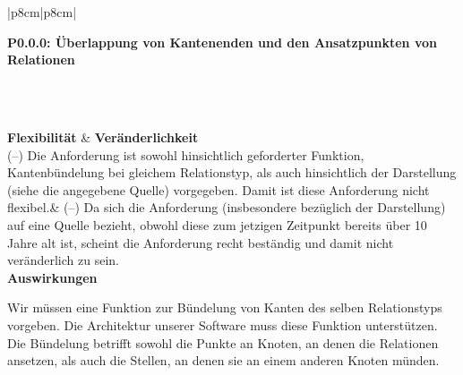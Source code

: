 \documentclass[enabledeprecatedfontcommands,fontsize=11pt,paper=a4,twoside]{scrartcl}
\newcounter{one}
\newcounter{two}[one]
\newcounter{three}[two]
\newcommand{\tone}{0\theone}
\newcommand{\ttwo}{0\thetwo}
\newcommand{\three}{\stepcounter{three}0\thethree}
\begin{document}
\newpage
\begin{tabular} {|p{8cm}|p{8cm}|}
	\hline
	 {\parbox{16cm}{\textbf{\hypertarget{cc}{P\tone.\ttwo.\three}: Überlappung von Kantenenden und den Ansatzpunkten von Relationen}} } \\  \hline\hline 
	\rule{0pt}{11ex}\\ [3ex] \hline
	\textbf{Flexibilität}  & \textbf{Veränderlichkeit} \\
	(–) Die Anforderung ist sowohl hinsichtlich geforderter Funktion, Kantenbündelung bei gleichem Relationstyp, als auch hinsichtlich der Darstellung (siehe die angegebene Quelle) vorgegeben. Damit ist diese Anforderung nicht flexibel.& 
	(–) Da sich die Anforderung (insbesondere bezüglich der Darstellung) auf eine Quelle bezieht, obwohl diese zum jetzigen Zeitpunkt bereits über 10 Jahre alt ist, scheint die Anforderung recht beständig und damit nicht veränderlich zu sein.\\
	\hline
	 {\textbf{Auswirkungen}} \\
	 {\parbox{16cm}{Wir müssen eine Funktion zur Bündelung von Kanten des selben Relationstyps vorgeben. Die Architektur unserer Software muss diese Funktion unterstützen. Die Bündelung betrifft sowohl die Punkte an Knoten, an denen die Relationen ansetzen, als auch die Stellen, an denen sie an einem anderen Knoten münden.} }\\[5ex] \hline
\end{tabular}
\end{document}
